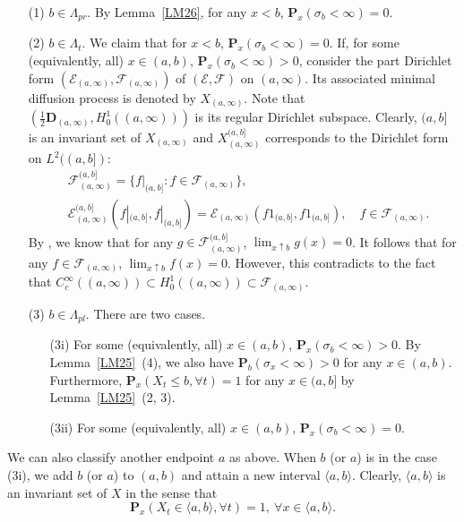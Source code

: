 \documentclass[a4paper]{amsart}
\theoremstyle{definition}
\theoremstyle{remark}
\numberwithin{equation}{section}
\begin{document}
\begin{itemize}
\item[(1)] $b\in \Lambda_{pr}$.
By Lemma~\ref{LM26}, for any $x<b$, $\mathbf{P}_x(\sigma_b<\infty)=0$.
\item[(2)] $b\in \Lambda_t$. We claim that for $x<b$, $\mathbf{P}_x(\sigma_b<\infty)=0$. If, for some (equivalently, all) $x\in (a,b)$, $\mathbf{P}_x(\sigma_b<\infty)>0$, consider the part Dirichlet form $({{\mathcal{E}}}_{(a,\infty)},{{\mathcal{F}}}_{(a,\infty)})$ of $({{\mathcal{E}}},{{\mathcal{F}}})$ on $(a,\infty)$. Its associated minimal diffusion process is denoted by $X_{(a,\infty)}$. Note that $(\frac{1}{2}\mathbf{D}_{(a,\infty)}, H^1_0((a,\infty)))$ is its regular Dirichlet subspace. Clearly, $(a,b]$ is an invariant set of $X_{(a,\infty)}$ and $X_{(a,\infty)}^{(a,b]}$ corresponds to the Dirichlet form on $L^2((a,b])$:
\[
\begin{aligned}
	&{{\mathcal{F}}}^{(a,b]}_{(a,\infty)}=\{f|_{(a,b]}: f\in {{\mathcal{F}}}_{(a,\infty)}\},  \\
	&{{\mathcal{E}}}^{(a,b]}_{(a,\infty)}(f|_{(a,b]},f|_{(a,b]})={{\mathcal{E}}}_{(a,\infty)}(f1_{(a,b]},f1_{(a,b]}),\quad f\in {{\mathcal{F}}}_{(a,\infty)}.
\end{aligned}\]
By \cite[Theorem~3.5.8]{CF12}, we know that for any $g\in {{\mathcal{F}}}^{(a,b]}_{(a,\infty)}$, $\lim_{x\uparrow b}g(x)=0$. It follows that for any $f\in {{\mathcal{F}}}_{(a,\infty)}$, $\lim_{x\uparrow b}f(x)=0$. However, this contradicts to the fact that $C_c^\infty((a,\infty))\subset H^1_0((a,\infty))\subset {{\mathcal{F}}}_{(a,\infty)}$.
\item[(3)] $b\in \Lambda_{pl}$. There are two cases.
\begin{itemize}
\item[(3i)] For some (equivalently, all) $x\in (a,b)$, $\mathbf{P}_x(\sigma_b<\infty)>0$. By Lemma~\ref{LM25}~(4), we also have $\mathbf{P}_b(\sigma_x<\infty)>0$ for any $x\in (a,b)$. Furthermore, $\mathbf{P}_x(X_t\leq b,\forall t)=1$ for any $x\in (a,b]$ by Lemma~\ref{LM25}~(2, 3).
\item[(3ii)] For some (equivalently, all) $x\in (a,b)$, $\mathbf{P}_x(\sigma_b<\infty)=0$.
\end{itemize}
\end{itemize}
We can also classify another endpoint $a$ as above. When $b$ (or $a$) is in the case (3i), we add $b$ (or $a$) to $(a,b)$ and attain a new interval $\langle a,b\rangle$. Clearly, $\langle a,b\rangle$ is an invariant set of $X$ in the sense that
\[
	\mathbf{P}_x(X_t\in \langle a,b\rangle, \forall t)=1,\ \forall x\in \langle a, b\rangle.
\]
\end{document}
